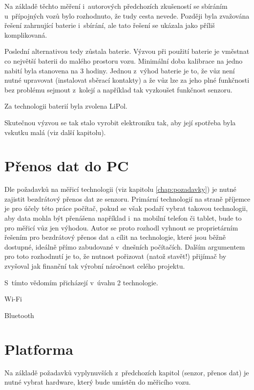 Na základě těchto měření i~autorových předchozích zkušeností se sbíráním
u~přípojných vozů bylo rozhodnuto, že tudy cesta nevede. Později byla zvažována
řešení zahrnující baterie i~sbírání, ale tato řešení se ukázala jako příliš
komplikovaná.

Poslední alternativou tedy zůstala baterie. Výzvou při použití baterie je
vměstnat co největší baterii do malého prostoru vozu. Minimální doba kalibrace
na jedno nabití byla stanovena na 3 hodiny. Jednou z~výhod baterie je to, že
vůz není nutné upravovat (instalovat sběrací kontakty) a že vůz lze za jeho
plné funkčnosti bez problému sejmout z~kolejí a například tak vyzkoušet
funkčnost senzoru.

Za technologii baterií byla zvolena LiPol.

Skutečnou výzvou se tak stalo vyrobit elektroniku tak, aby její spotřeba byla
vskutku malá (viz další kapitolu).

\section{Přenos dat do PC}
\label{sec:wsm-prenos-pc}

Dle požadavků na měřicí technologii (viz kapitolu \ref{chap:pozadavky}) je
nutné zajistit bezdrátový přenos dat ze senzoru. Primární technologií na straně
příjemce je pro účely této práce počítač, pokud se však podaří vybrat takovou
technologii, aby data mohla být přenášena například i~na mobilní telefon či
tablet, bude to pro měřicí vůz jen výhodou. Autor se proto rozhodl vyhnout se
proprietárním řešením pro bezdrátový přenos dat a cílit na technologie, které
jsou běžně dostupné, ideálně přímo zabudované v~dnešních počítačích. Dalším
argumentem pro toto rozhodnutí je to, že nutnost pořizovat (natož stavět!)
přijímač by zvyšoval jak finanční tak výrobní náročnost celého projektu.

S~tímto vědomím přicházejí v~úvahu 2 technologie.

\begin{compactenum}
\item Wi-Fi
\item Bluetooth
\end{compactenum}

\section{Platforma}
\label{sec:wsm-platforma}

Na základě požadavků vyplynuvších z~předchozích kapitol (senzor, přenos dat)
je nutné vybrat hardware, který bude umístěn do měřicího vozu.

